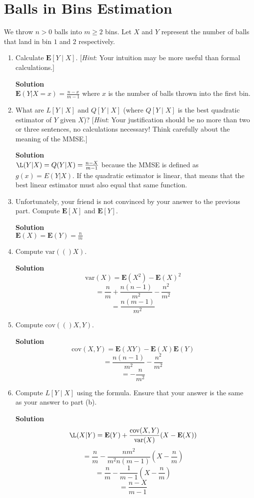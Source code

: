 \documentclass[11pt]{article}
\newcommand*{\Question}[1]{\section{#1}}
\newenvironment{Parts}{\begin{enumerate}[label=(\alph*)]}{\end{enumerate}}
\newcommand*{\Part}{\item}
\newenvironment{Answer}{\vspace{10pt}\begin{mdframed}\textbf{Solution}\\}{\end{mdframed}\vfill\pagebreak[3]}
\newenvironment{Answer}{\vspace{10pt}}{\vfill\pagebreak[3]}
\newcommand*{\E}{\textbf{E}}
\newcommand*{\var}[1]{\text{var}(#1)}
\newcommand*{\cov}[1]{\text{cov}(#1)}
\begin{document}
\Question{Balls in Bins Estimation}

We throw $n > 0$ balls into $m \geq 2$ bins. Let $X$ and $Y$ represent the number of balls that land in bin $1$ and $2$ respectively.

\begin{Parts}
  \Part Calculate $\E[Y \mid X]$. [\textit{Hint}: Your intuition may be more useful than formal calculations.]
  \begin{Answer}
    $\E(Y|X=x)=\frac{n-x}{m-1}$ where $x$ is the number of balls thrown into the first bin.
  \end{Answer}
  
  \Part What are $L[Y \mid X]$ and $Q[Y \mid X]$ (where $Q[Y \mid X]$ is the best quadratic estimator of $Y$ given $X$)? [\textit{Hint}: Your justification should be no more than two or three sentences, no calculations necessary! Think carefully about the meaning of the MMSE.]
  \begin{Answer}
    $\L(Y|X)=Q(Y|X)=\frac{n-X}{m-1}$ because the MMSE is defined as $g(x)=E(Y|X)$. If the quadratic estimator is linear, that means that the best linear estimator must also equal that same function.
  \end{Answer}
  
  \Part Unfortunately, your friend is not convinced by your answer to the previous part. Compute $\E[X]$ and $\E[Y]$.
  \begin{Answer}
    $\E(X)=\E(Y)=\frac{n}{m}$
  \end{Answer}

  \Part Compute $\var(X)$.
  \begin{Answer}
    $$\var{X}=\E(X^2)-\E(X)^2$$
    $$=\frac{n}{m}+\frac{n(n-1)}{m^2}-\frac{n^2}{m^2}$$
    $$=\frac{n(m-1)}{m^2}$$
  \end{Answer}
  
  \Part Compute $\cov(X, Y)$.
  \begin{Answer}
    $$\cov{X,Y}=\E(XY)-\E(X)\E(Y)$$
    $$=\frac{n(n-1)}{m^2}-\frac{n^2}{m^2}$$
    $$=-\frac{n}{m^2}$$
  \end{Answer}
  
  \Part Compute $L[Y \mid X]$ using the formula. Ensure that your answer is the same as your answer to part (b).
  \begin{Answer}
    $$\L(X|Y)=\E(Y)+\frac{\cov{X,Y}}{\var{X}}(X-\E(X))$$
    $$=\frac{n}{m}-\frac{nm^2}{m^2n(m-1)}(X-\frac{n}{m})$$
    $$=\frac{n}{m}-\frac{1}{m-1}(X-\frac{n}{m})$$
    $$=\frac{n-X}{m-1}$$
  \end{Answer}
\end{Parts}
\end{document}
